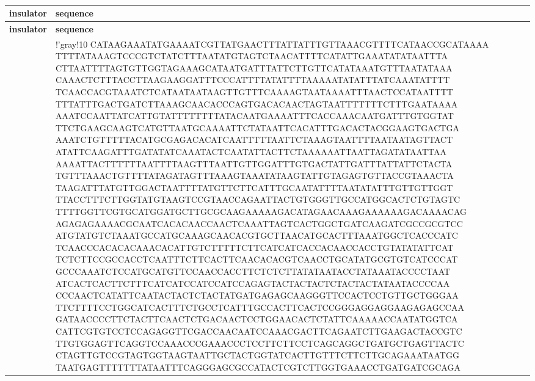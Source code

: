 \begin{xltabular}{\textwidth}{Xl}
	\caption{
	}\label{stab:FLins}\\
	\toprule
	\textbf{insulator} & \textbf{sequence} \\
	\midrule
	\endfirsthead
	\toprule
	\textbf{insulator} & \textbf{sequence} \\
	\midrule
	\endhead
	\midrule
	\endfoot
	\bottomrule
	\endlastfoot
	 & 
		\begin{minipage}{.85\textwidth}
			\vspace*{4pt}
			\DNA!'{gray!10}
				CATAAGAAATATGAAAATCGTTATGAACTTTATTATTTGTTAAACGTTTTCATAACCGCATAAAA
				TTTTATAAAGTCCCGTCTATCTTTAATATGTAGTCTAACATTTTCATATTGAAATATATAATTTA
				CTTAATTTTAGTGTTGGTAGAAAGCATAATGATTTATTCTTGTTCATATAAATGTTTAATATAAA
				CAAACTCTTTACCTTAAGAAGGATTTCCCATTTTATATTTTAAAAATATATTTATCAAATATTTT
				TCAACCACGTAAATCTCATAATAATAAGTTGTTTCAAAAGTAATAAAATTTAACTCCATAATTTT
				TTTATTTGACTGATCTTAAAGCAACACCCAGTGACACAACTAGTAATTTTTTTCTTTGAATAAAA
				AAATCCAATTATCATTGTATTTTTTTTATACAATGAAAATTTCACCAAACAATGATTTGTGGTAT
				TTCTGAAGCAAGTCATGTTAATGCAAAATTCTATAATTCACATTTGACACTACGGAAGTGACTGA
				AAATCTGTTTTTACATGCGAGACACATCAATTTTTAATTCTAAAGTAATTTTAATAATAGTTACT
				ATATTCAAGATTTGATATATCAAATACTCAATATTACTTCTAAAAAATTAATTAGATATAATTAA
				AAAATTACTTTTTTAATTTTAAGTTTAATTGTTGGATTTGTGACTATTGATTTATTATTCTACTA
				TGTTTAAACTGTTTTATAGATAGTTTAAAGTAAATATAAGTATTGTAGAGTGTTACCGTAAACTA
				TAAGATTTATGTTGGACTAATTTTATGTTCTTCATTTGCAATATTTTAATATATTTGTTGTTGGT
				TTACCTTTCTTGGTATGTAAGTCCGTAACCAGAATTACTGTGGGTTGCCATGGCACTCTGTAGTC
				TTTTGGTTCGTGCATGGATGCTTGCGCAAGAAAAAGACATAGAACAAAGAAAAAAGACAAAACAG
				AGAGAGAAAACGCAATCACACAACCAACTCAAATTAGTCACTGGCTGATCAAGATCGCCGCGTCC
				ATGTATGTCTAAATGCCATGCAAAGCAACACGTGCTTAACATGCACTTTAAATGGCTCACCCATC
				TCAACCCACACACAAACACATTGTCTTTTTCTTCATCATCACCACAACCACCTGTATATATTCAT
				TCTCTTCCGCCACCTCAATTTCTTCACTTCAACACACGTCAACCTGCATATGCGTGTCATCCCAT
				GCCCAAATCTCCATGCATGTTCCAACCACCTTCTCTCTTATATAATACCTATAAATACCCCTAAT
				ATCACTCACTTCTTTCATCATCCATCCATCCAGAGTACTACTACTCTACTACTATAATACCCCAA
				CCCAACTCATATTCAATACTACTCTACTATGATGAGAGCAAGGGTTCCACTCCTGTTGCTGGGAA
				TTCTTTTCCTGGCATCACTTTCTGCCTCATTTGCCACTTCACTCCGGGAGGAGGAAGAGAGCCAA
				GATAACCCCTTCTACTTCAACTCTGACAACTCCTGGAACACTCTATTCAAAAACCAATATGGTCA
				CATTCGTGTCCTCCAGAGGTTCGACCAACAATCCAAACGACTTCAGAATCTTGAAGACTACCGTC
				TTGTGGAGTTCAGGTCCAAACCCGAAACCCTCCTTCTTCCTCAGCAGGCTGATGCTGAGTTACTC
				CTAGTTGTCCGTAGTGGTAAGTAATTGCTACTGGTATCACTTGTTTCTTCTTGCAGAAATAATGG
				TAATGAGTTTTTTTATAATTTCAGGGAGCGCCATACTCGTCTTGGTGAAACCTGATGATCGCAGA

\end{minipage}
\end{xltabular}
